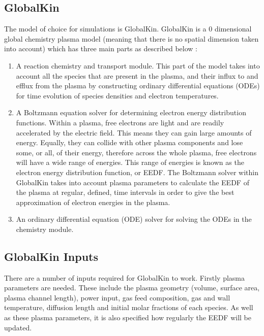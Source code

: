 \documentclass[11pt, oneside]{article}   	%
\begin{document}
\subsection{GlobalKin}
The model of choice for simulations is GlobalKin.
GlobalKin is a 0 dimensional global chemistry plasma model (meaning that there is no spatial dimension taken into account) which has three main parts as described below \cite{Stafford2004O2}:
\begin{enumerate}
\item A reaction chemistry and transport module. 
This part of the model takes into account all the species that are present in the plasma, and their influx to and efflux from the plasma by constructing ordinary differential equations (ODEs) for time evolution of species densities and electron temperatures.
\item A Boltzmann equation solver for determining electron energy distribution functions. 
Within a plasma, free electrons are light and are readily accelerated by the electric field. 
This means they can gain large amounts of energy.
Equally, they can collide with other plasma components and lose some, or all, of their energy, therefore across the whole plasma, free electrons will have a wide range of energies.
This range of energies is known as the electron energy distribution function, or EEDF.
The Boltzmann solver within GlobalKin takes into account plasma parameters to calculate the EEDF of the plasma at regular, defined, time intervals in order to give the best approximation of electron energies in the plasma.
\item An ordinary differential equation (ODE) solver for solving the ODEs in the chemistry module.
\end{enumerate}


\subsection{GlobalKin Inputs}
There are a number of inputs required for GlobalKin to work.
Firstly plasma parameters are needed.
These include the plasma geometry (volume, surface area, plasma channel length), power input, gas feed composition, gas and wall temperature, diffusion length and initial molar fractions of each species.
As well as these plasma parameters, it is also specified how regularly the EEDF will be updated.
\end{document}
